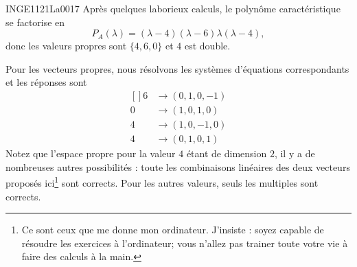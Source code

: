 \begin{corrige}{INGE1121La0017}
	Après quelques laborieux calculs, le polynôme caractéristique se factorise en
	\begin{equation}
		P_A(\lambda)=(\lambda-4)(\lambda-6)\lambda(\lambda-4),
	\end{equation}
	donc les valeurs propres sont $\{ 4,6,0 \}$ et $4$ est double.

	Pour les vecteurs propres, nous résolvons les systèmes d'équations correspondants et les réponses sont
	\begin{equation}		\label{EqVectosDSProps}
		\begin{aligned}[]
			6 &\to (0, 1, 0, -1)\\
			0 &\to (1, 0, 1, 0)\\
			4 &\to (1, 0, -1, 0)\\
			4 &\to (0, 1, 0, 1)
		\end{aligned}
	\end{equation}
	Notez que l'espace propre pour la valeur $4$ étant de dimension $2$, il y a de nombreuses autres possibilités : toute les combinaisons linéaires des deux vecteurs proposés ici\footnote{Ce sont ceux que me donne mon ordinateur. J'insiste : soyez capable de résoudre les exercices à l'ordinateur; vous n'allez pas trainer toute votre vie à faire des calculs à la main.} sont corrects. Pour les autres valeurs, seuls les multiples sont corrects.


\end{corrige}
